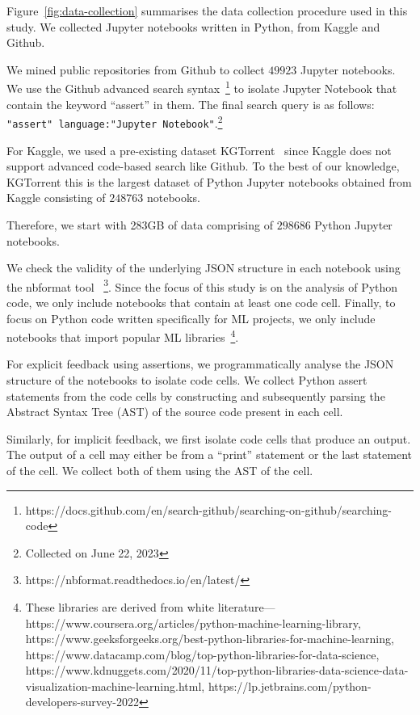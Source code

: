 Figure~\ref{fig:data-collection} summarises the data collection procedure used in this study. We collected Jupyter notebooks written in Python, from Kaggle and Github. 

We mined public repositories from Github to collect $49923$ Jupyter notebooks. We use the Github advanced search syntax~\footnote{https://docs.github.com/en/search-github/searching-on-github/searching-code} to isolate Jupyter Notebook that contain the keyword ``assert'' in them. The final search query is as follows: \texttt{"assert" language:"Jupyter Notebook"}.\footnote{Collected on June 22, 2023}

For Kaggle, we used a pre-existing dataset KGTorrent~\cite{quaranta2021kgtorrent} since Kaggle does not support advanced code-based search like Github. To the best of our knowledge, KGTorrent this is the largest dataset of Python Jupyter notebooks obtained from Kaggle consisting of $248763$ notebooks.

Therefore, we start with 283GB of data comprising of $298686$ Python Jupyter notebooks.

We check the validity of the underlying JSON structure in each notebook using the nbformat tool ~\footnote{https://nbformat.readthedocs.io/en/latest/}. Since the focus of this study is on the analysis of Python code, we only include notebooks that contain at least one code cell. Finally, to focus on Python code written specifically for ML projects, we only include notebooks that import popular ML libraries~\footnote{These libraries are derived from white literature---https://www.coursera.org/articles/python-machine-learning-library, https://www.geeksforgeeks.org/best-python-libraries-for-machine-learning, https://www.datacamp.com/blog/top-python-libraries-for-data-science, https://www.kdnuggets.com/2020/11/top-python-libraries-data-science-data-visualization-machine-learning.html, https://lp.jetbrains.com/python-developers-survey-2022}.

For explicit feedback using assertions, we programmatically analyse the JSON structure of the notebooks to isolate code cells. We collect Python assert statements from the code cells by constructing and subsequently parsing the Abstract Syntax Tree (AST) of the source code present in each cell.

Similarly, for implicit feedback, we first isolate code cells that produce an output. The output of a cell may either be from a ``print'' statement or the last statement of the cell. We collect both of them using the AST of the cell.


